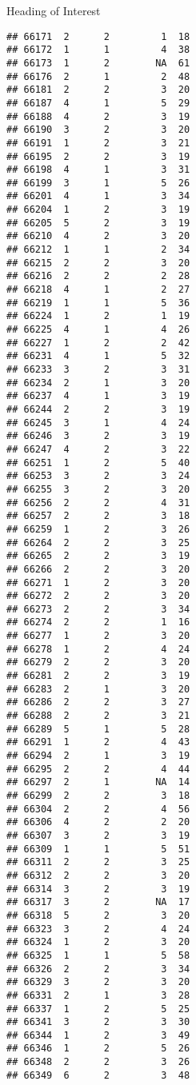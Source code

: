 \documentclass[
  ignorenonframetext,
]{beamer}
\begin{document}
\begin{frame}[fragile]{Heading of Interest}
\begin{verbatim}
## 66171  2      2         1  18
## 66172  1      1         4  38
## 66173  1      2        NA  61
## 66176  2      1         2  48
## 66181  2      2         3  20
## 66187  4      1         5  29
## 66188  4      2         3  19
## 66190  3      2         3  20
## 66191  1      2         3  21
## 66195  2      2         3  19
## 66198  4      1         3  31
## 66199  3      1         5  26
## 66201  4      1         3  34
## 66204  1      2         3  19
## 66205  5      2         3  19
## 66210  4      2         3  20
## 66212  1      1         2  34
## 66215  2      2         3  20
## 66216  2      2         2  28
## 66218  4      1         2  27
## 66219  1      1         5  36
## 66224  1      2         1  19
## 66225  4      1         4  26
## 66227  1      2         2  42
## 66231  4      1         5  32
## 66233  3      2         3  31
## 66234  2      1         3  20
## 66237  4      1         3  19
## 66244  2      2         3  19
## 66245  3      1         4  24
## 66246  3      2         3  19
## 66247  4      2         3  22
## 66251  1      2         5  40
## 66253  3      2         3  24
## 66255  3      2         3  20
## 66256  2      2         4  31
## 66257  2      2         3  18
## 66259  1      2         3  26
## 66264  2      2         3  25
## 66265  2      2         3  19
## 66266  2      2         3  20
## 66271  1      2         3  20
## 66272  2      2         3  20
## 66273  2      2         3  34
## 66274  2      2         1  16
## 66277  1      2         3  20
## 66278  1      2         4  24
## 66279  2      2         3  20
## 66281  2      2         3  19
## 66283  2      1         3  20
## 66286  2      2         3  27
## 66288  2      2         3  21
## 66289  5      1         5  28
## 66291  1      2         4  43
## 66294  2      1         3  19
## 66295  2      2         4  44
## 66297  2      1        NA  14
## 66299  2      2         3  18
## 66304  2      2         4  56
## 66306  4      2         2  20
## 66307  3      2         3  19
## 66309  1      1         5  51
## 66311  2      2         3  25
## 66312  2      2         3  20
## 66314  3      2         3  19
## 66317  3      2        NA  17
## 66318  5      2         3  20
## 66323  3      2         4  24
## 66324  1      2         3  20
## 66325  1      1         5  58
## 66326  2      2         3  34
## 66329  3      2         3  20
## 66331  2      1         3  28
## 66337  1      2         5  25
## 66341  3      2         3  30
## 66344  1      2         3  49
## 66346  1      2         5  26
## 66348  2      2         3  26
## 66349  6      2         3  48

\end{verbatim}
\end{frame}
\end{document}
